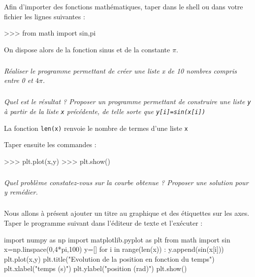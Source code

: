 \documentclass[10pt]{article}
\begin{document}
\begin{py}
Afin d'importer des fonctions mathématiques, taper dans le shell ou dans votre fichier les lignes suivantes : 
\begin{python}
>>> from math import sin,pi
\end{python}

On dispose alors de la fonction sinus et de la constante $\pi$.
\end{py}


\subparagraph{}
\textit{Réaliser le programme permettant de créer une liste \textsl{x} de 10 nombres compris entre 0 et $4\pi$.}




\subparagraph{}
\textit{Quel est le résultat ? Proposer un programme permettant de construire une liste \texttt{y} à partir de la liste \texttt{x} précédente, de telle sorte que \texttt{y[i]=sin(x[i])}}

\begin{rem}
La fonction \texttt{len(x)} renvoie le nombre de termes d'une  liste \texttt{x}
\end{rem}

Taper ensuite les commandes :
\begin{py}
\begin{python}
>>> plt.plot(x,y)
>>> plt.show()
\end{python}
\end{py}

\subparagraph{}
\textit{Quel problème constatez-vous sur la courbe obtenue ? Proposer une solution pour y remédier.}

\subparagraph{}
Nous allons à présent ajouter un titre au graphique et des étiquettes sur les axes. Taper le programme suivant dans l'éditeur de texte et l'exécuter :
\begin{py}
\begin{python}
import numpy as np
import matplotlib.pyplot as plt
from math import sin
x=np.linspace(0,4*pi,100)
y=[]
for i in range(len(x)) :
	y.append(sin(x[i]))
plt.plot(x,y)
plt.title("Evolution de la position en fonction du temps")
plt.xlabel("temps (s)")
plt.ylabel("position (rad)")
plt.show()
\end{python}
\end{py}
\end{document}
